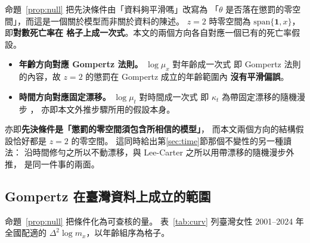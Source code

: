 \documentclass[UTF8, fontset=macnew, a4paper, 12pt]{ctexart}
\begin{document}
命題~\ref{prop:null} 把先決條件由「資料夠平滑嗎」改寫為
「$\theta$ 是否落在懲罰的零空間」，而這是一個關於模型而非關於資料的陳述。
$z=2$ 時零空間為 $\mathrm{span}\{\mathbf 1,x\}$，即\textbf{對數死亡率在
格子上成一次式}。本文的兩個方向各自對應一個已有的死亡率假設。

\begin{itemize}
\item \textbf{年齡方向對應 Gompertz 法則。} $\log\mu_x$ 對年齡成一次式
即 Gompertz 法則的內容，故 $z=2$ 的懲罰在 Gompertz 成立的年齡範圍內
\textbf{沒有平滑偏誤}。
\item \textbf{時間方向對應固定漂移。} $\log\mu_t$ 對時間成一次式
即 $\kappa_t$ 為帶固定漂移的隨機漫步 \citep{lee1992}，
亦即本文外推步驟所用的假設本身。
\end{itemize}

亦即\textbf{先決條件是「懲罰的零空間須包含所相信的模型」}，
而本文兩個方向的結構假設恰好都是 $z=2$ 的零空間。
這同時給出第\ref{sec:time}節那個不變性的另一種讀法：
沿時間修勻之所以不動漂移，與 Lee-Carter 之所以用帶漂移的隨機漫步外推，
是同一件事的兩面。

\subsection{Gompertz 在臺灣資料上成立的範圍}\label{subsec:gompertz}

命題~\ref{prop:null} 把條件化為可查核的量。
表~\ref{tab:curv} 列臺灣女性 2001--2024 年全國配適的
$\Delta^2\log m_x$，以年齡組序為格子。
\end{document}
